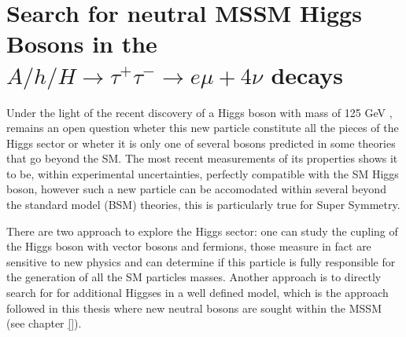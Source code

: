 \chapter[Neutral MSSM Higgs Bosons Search...]{Search for neutral MSSM Higgs Bosons in the 
$A/h/H \rightarrow \tau^{+}\tau^{-} \rightarrow e \mu + 4\nu$ decays} \label{chap:anal}

%
%
Under the light of the recent discovery of a Higgs 
boson with mass of 125 GeV \cite{}, remains an open question
wheter this new particle constitute all the pieces of the Higgs
sector or wheter it is only one of several bosons predicted in some theories 
that go beyond the SM. The most recent measurements \cite{} of its
properties shows it to be, within experimental uncertainties, perfectly 
compatible with the SM Higgs boson, however such a new particle can 
be accomodated within several beyond the 
standard model (BSM) theories, this is particularly true for Super Symmetry. 

There are two approach to explore the Higgs sector:
one can study the cupling of the Higgs boson with vector
bosons and fermions, those measure in fact are sensitive to new physics and can determine
if this particle is  fully responsible for
the generation of all the SM particles masses. 
Another approach is to directly search for %
for additional Higgses in a well defined model, which is the approach followed in this
thesis where new neutral bosons are sought within the MSSM (see chapter \ref{}). 





